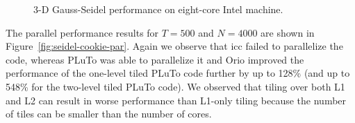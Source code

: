 \begin{figure} [htb]
\begin{center} 
    
\end{center}
\vspace{-.2in} 
\caption{3-D Gauss-Seidel performance on eight-core Intel machine.} 
\label{fig:seidel-cookie-results} 
\vspace{-.1in}
\end{figure} 

The parallel performance results for $T=500$ and $N=4000$ are shown in
Figure~\ref{fig:seidel-cookie-par}. Again we observe that icc failed to
parallelize the code, whereas PLuTo was able to parallelize it and Orio
improved the performance of the one-level tiled PLuTo code further by up to
128\% (and up to 548\% for the two-level tiled PLuTo code). We observed that
tiling over both L1 and L2 can result in worse performance than L1-only
tiling because the number of tiles can be smaller than the number of cores.


